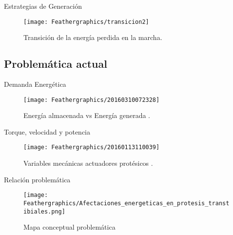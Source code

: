 \documentclass[10pt]{beamer}
\begin{document}
\begin{frame}{Estrategias de Generación}

\begin{figure}
\begin{centering}
\texttt{[image: Feathergraphics/transicion2]}
\par\end{centering}
{\scriptsize{}\caption{{\scriptsize{}Transición de la energía perdida en la marcha.\cite{Collins2010}}}
}{\scriptsize \par}
\end{figure}
\end{frame}


\subsection{Problemática actual}
\begin{frame}{Demanda Energética}

\begin{figure}
\begin{centering}
\texttt{[image: Feathergraphics/20160310072328]}
\par\end{centering}
{\tiny{}\caption{{\scriptsize{}Energía almacenada vs Energía generada \cite{Cherelle2014a}.}}
}{\tiny \par}

\end{figure}

\end{frame}

\begin{frame}{Torque, velocidad y potencia}

\begin{figure}
\begin{centering}
\texttt{[image: Feathergraphics/20160113110039]}
\par\end{centering}
{\tiny{}\caption{{\tiny{}Variables mecánicas actuadores protésicos \cite{Cherelle2014a}}.}
}{\tiny \par}

\end{figure}

\end{frame}

\begin{frame}{Relación problemática}

\begin{figure}
\begin{centering}
\texttt{[image: Feathergraphics/Afectaciones\_energeticas\_en\_protesis\_transtibiales.png]}
\par\end{centering}
\caption{Mapa conceptual problemática}

\end{figure}

\end{frame}
\end{document}
